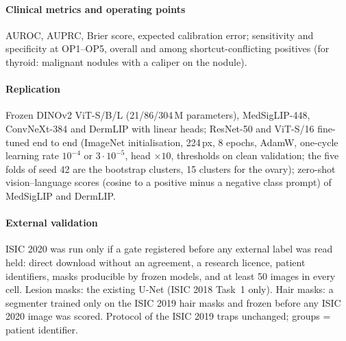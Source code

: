 \paragraph{Clinical metrics and operating points} AUROC, AUPRC, Brier score, expected calibration error; sensitivity and
specificity at OP1--OP5, overall and among shortcut-conflicting positives (for thyroid: malignant nodules with a caliper
on the nodule).
\paragraph{Replication} Frozen DINOv2 ViT-S/B/L (21/86/304\,M parameters), MedSigLIP-448, ConvNeXt-384 and DermLIP with
linear heads; ResNet-50 and ViT-S/16 fine-tuned end to end (ImageNet initialisation, 224\,px, 8 epochs, AdamW, one-cycle
learning rate $10^{-4}$ or $3\cdot10^{-5}$, head $\times10$, thresholds on clean validation; the five folds of seed 42 are
the bootstrap clusters, 15 clusters for the ovary); zero-shot vision--language scores (cosine to a positive minus a
negative class prompt) of MedSigLIP and DermLIP.
\paragraph{External validation} ISIC 2020 \citep{rotemberg2021isic2020} was run only if a gate registered before any
external label was read held: direct download without an agreement, a research licence, patient identifiers, masks
producible by frozen models, and at least 50 images in every cell. Lesion masks: the existing U-Net (ISIC 2018 Task~1
only). Hair masks: a segmenter trained only on the ISIC 2019 hair masks and frozen before any ISIC 2020 image was scored.
Protocol of the ISIC 2019 traps unchanged; groups = patient identifier.
